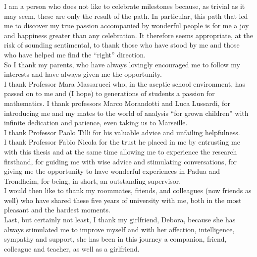 \documentclass[corpo=11pt, stile=classica, tipotesi=custom,
greek, evenboxes, english]{toptesi}
\numberwithin{equation}{chapter}
\theoremstyle{definition}
\theoremstyle{remark}
\begin{document}
\english

\ringraziamenti
I am a person who does not like to celebrate milestones because, as trivial as it may seem, these are only the result of the path. In particular, this path that led me to discover my true passion accompanied by wonderful people is for me a joy and happiness greater than any celebration.
It therefore seems appropriate, at the risk of sounding sentimental, to thank those who have stood by me and those who have helped me find the ``right'' direction.\\
So I thank my parents, who have always lovingly encouraged me to follow my interests and have always given me the opportunity.\\
I thank Professor Mara Massarucci who, in the aseptic school environment, has passed on to me and (I hope) to generations of students a passion for mathematics.
I thank professors Marco Morandotti and Luca Lussardi, for introducing me and my mates to the world of analysis ``for grown children'' with infinite dedication and patience, even taking us to Marseille.\\
I thank Professor Paolo Tilli for his valuable advice and unfailing helpfulness.\\
I thank Professor Fabio Nicola for the trust he placed in me by entrusting me with this thesis and at the same time allowing me to experience the research firsthand, for guiding me with wise advice and stimulating conversations, for giving me the opportunity to have wonderful experiences in Padua and Trondheim, for being, in short, an outstanding supervisor.\\
I would then like to thank my roommates, friends, and colleagues (now friends as well) who have shared these five years of university with me, both in the most pleasant and the hardest moments.\\
Last, but certainly not least, I thank my girlfriend, Debora, because she has always stimulated me to improve myself and with her affection, intelligence, sympathy and support, she has been in this journey a companion, friend, colleague and teacher, as well as a girlfriend.
\end{document}
